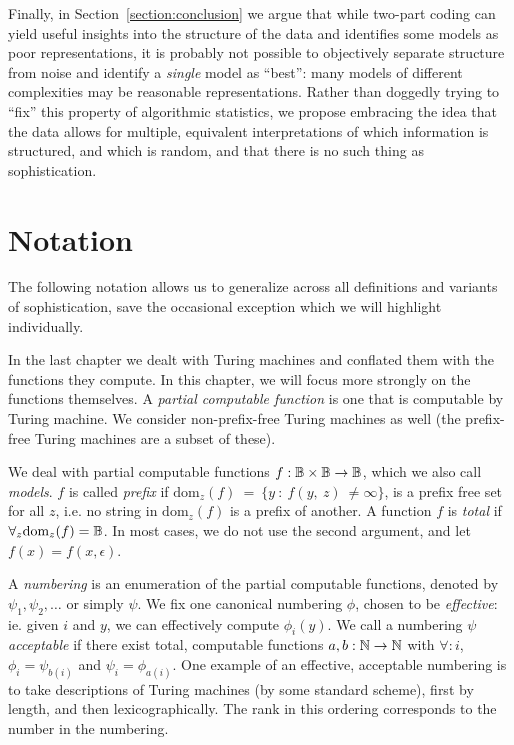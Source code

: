 Finally, in Section~\ref{section:conclusion} we argue that while two-part coding can yield useful insights into the structure of the data and identifies some models as poor representations, it is probably not possible to objectively separate structure from noise and identify a \emph{single} model as ``best'': many models of different complexities may be reasonable representations. Rather than doggedly trying to ``fix'' this property of algorithmic statistics, we propose embracing the idea that the data allows for multiple, equivalent interpretations of which information is structured, and which is random, and that there is no such thing as sophistication.

\section{Notation}

The following notation allows us to generalize across all definitions and variants of sophistication, save the occasional exception which we will highlight individually.

In the last chapter we dealt with Turing machines and conflated them with the functions they compute. In this chapter, we will focus more strongly on the functions themselves. A \emph{partial computable function} is one that is computable by Turing machine. We consider non-prefix-free Turing machines as well (the prefix-free Turing machines are a subset of these). 

We deal with partial computable functions $f: {\mathbb B} \times {\mathbb B} \to {\mathbb B}$, which we also call \emph{models}. $f$ is called \emph{prefix} if $\text{dom}_z(f)~=~\{y~:~f(y,~z)~\neq \infty\}$, is a prefix free set for all $z$, i.e. no string in $\text{dom}_z(f)$ is a prefix of another. A function $f$ is \emph{total} if $\forall_z \text{dom}_z(f) = {\mathbb B}$. In most cases, we do not use the second argument, and let $f(x) = f(x, \epsilon)$.

A \emph{numbering} is an enumeration of the partial computable functions, denoted by $\psi_1, \psi_2, \ldots$ or simply $\psi$. We fix one canonical numbering $\phi$, chosen to be \emph{effective}: ie. given $i$ and $y$, we can effectively compute $\phi_i(y)$. We call a numbering $\psi$ \emph{acceptable} if there exist total, computable functions $a, b: {\mathbb N} \to {\mathbb N}$ with $\forall: i$, $\phi_i = \psi_{b(i)}$ and  $\psi_i = \phi_{a(i)}$. One example of an effective, acceptable numbering is to take descriptions of Turing machines (by some standard scheme), first by length, and then lexicographically. The rank in this ordering corresponds to the number in the numbering.

